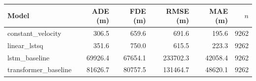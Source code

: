 \begin{tabular}{lrrrrr}
\hline
Model & ADE (m) & FDE (m) & RMSE (m) & MAE (m) & $n$ \\
\hline
constant\_velocity & 306.5 & 659.6 & 691.6 & 195.6 & 9262 \\
linear\_lstsq & 351.6 & 750.0 & 615.5 & 223.3 & 9262 \\
lstm\_baseline & 69926.4 & 67654.1 & 233702.3 & 42058.4 & 9262 \\
transformer\_baseline & 81626.7 & 80757.5 & 131464.7 & 48620.1 & 9262 \\
\hline
\end{tabular}
